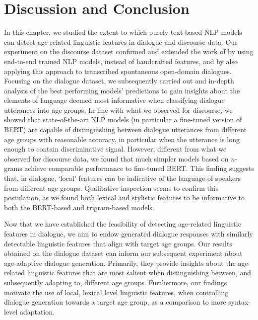 \section{Discussion and Conclusion}

In this chapter, we studied the extent to which purely text-based NLP models can detect age-related linguistic features in dialogue and discourse data.
Our experiment on the discourse dataset confirmed and extended the work of \cite{schler2006effects} by using end-to-end trained NLP models, instead of handcrafted features, and by also applying this approach to transcribed spontaneous open-domain dialogues.
Focusing on the dialogue dataset, we subsequently carried out and in-depth analysis of the best performing models' predictions to gain insights about the elements of language deemed most informative when classifying dialogue utterances into age groups.
In line with what we observed for discourse, we showed that state-of-the-art NLP models (in particular a fine-tuned version of BERT) are capable of distinguishing between dialogue utterances from different age groups with reasonable accuracy, in particular when the utterance is long enough to contain discriminative signal.
However, different from what we observed for discourse data, we found that much simpler models based on $n$-grams achieve comparable performance to fine-tuned BERT. 
This finding suggests that, in dialogue, ‘local’ features can be indicative of the language of speakers from different age groups. Qualitative inspection seems to confirm this postulation, as we found both lexical and stylistic features to be informative to both the BERT-based and trigram-based models.

Now that we have established the feasibility of detecting age-related linguistic features in dialogue, we aim to endow generated dialogue responses with similarly detectable linguistic features that align with target age groups. 
Our results obtained on the dialogue dataset can inform our subsequent experiment about age-adaptive dialogue generation. 
Primarily, they provide insights about the age-related linguistic features that are most salient when distinguishing between, and subsequently adapting to, different age groups.
Furthermore, our findings motivate the use of local, lexical level linguistic features, when controlling dialogue generation towards a target age group, as a comparison to more syntax-level adaptation.

